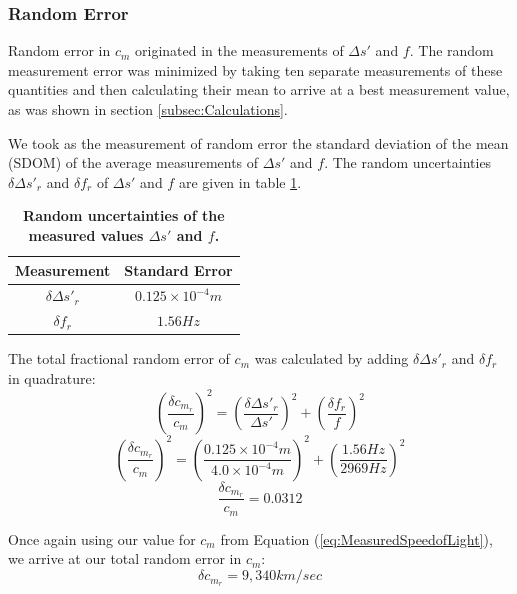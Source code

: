 \documentclass[twocolumn]{article}
\begin{document}
	\subsubsection{Random Error} \label{subsubsec:RandomError}
		Random error in $c_m$ originated in the measurements of $\Delta s'$ and $f$.
		The random measurement error was minimized by taking ten separate measurements of these quantities and then calculating their mean to arrive at a best measurement value, as was shown in section \ref{subsec:Calculations}.
		
		We took as the measurement of random error the standard deviation of the mean (SDOM) of the average measurements of $\Delta s'$ and $f$.
		The random uncertainties $\delta \Delta s'_r$ and $\delta f_r$ of $\Delta s'$ and $f$ are given in table \ref{tab:RandomUncert}.
		
		\begin{table}[t]
			\centering
			\begin{tabular}{c|c}
				Measurement	&	Standard Error	\\ \hline
				$\delta \Delta s'_r$	&	$0.125\times 10^{-4}m$	\\
				$\delta f_r$	&	$1.56 Hz$	\\
			\end{tabular}
			\caption{\textbf{Random uncertainties of the measured values $\Delta s'$ and $f$.}}
			\label{tab:RandomUncert}
		\end{table}
		
		The total fractional random error of $c_m$ was calculated by adding $\delta \Delta s'_r$ and $\delta f_r$ in quadrature:
		\begin{equation*}
			\left(\frac{\delta c_{m_r}}{c_m}\right)^2 = \left(\frac{\delta \Delta s'_r}{\Delta s'}\right)^2 + \left(\frac{\delta f_r}{f}\right)^2
		\end{equation*}
		\begin{equation*}
			\left(\frac{\delta c_{m_r}}{c_m}\right)^2 = \left(\frac{0.125\times 10^{-4} m}{4.0\times 10^{-4}m}\right)^2 + \left(\frac{1.56 Hz}{2969 Hz}\right)^2
		\end{equation*}
		\begin{equation}
			\frac{\delta c_{m_r}}{c_m} = 0.0312
		\end{equation}
		
		Once again using our value for $c_m$ from Equation (\ref{eq:MeasuredSpeedofLight}), we arrive at our total random error in $c_m$:
		\begin{equation}
			\delta c_{m_r} = 9,340 km/sec
		\end{equation}
		 
\end{document}
